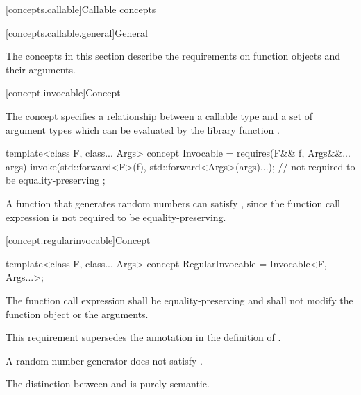 [concepts.callable]{Callable concepts}

[concepts.callable.general]{General}

\pnum
The concepts in this section describe the requirements on function
objects and their arguments.

[concept.invocable]{Concept }

\pnum
The  concept specifies a relationship between a callable
type  and a set of argument types  which
can be evaluated by the library function .

%
\begin{itemdecl}
template<class F, class... Args>
concept Invocable = requires(F&& f, Args&&... args) {
  invoke(std::forward<F>(f), std::forward<Args>(args)...); // not required to be equality-preserving
};
\end{itemdecl}

\begin{itemdescr}
\pnum
\begin{example}
A function that generates random numbers can satisfy ,
since the  function call expression is not required to be
equality-preserving.
\end{example}
\end{itemdescr}

[concept.regularinvocable]{Concept }

%
\begin{itemdecl}
template<class F, class... Args>
concept RegularInvocable = Invocable<F, Args...>;
\end{itemdecl}

\begin{itemdescr}
\pnum
The  function call expression shall be equality-preserving and
shall not modify the function object or the
arguments.
\begin{note}
This requirement supersedes the annotation in the definition of
.
\end{note}

\pnum
\begin{example}
A random number generator does not satisfy
.
\end{example}

\pnum
\begin{note}
The distinction between  and 
is purely semantic.
\end{note}
\end{itemdescr}

